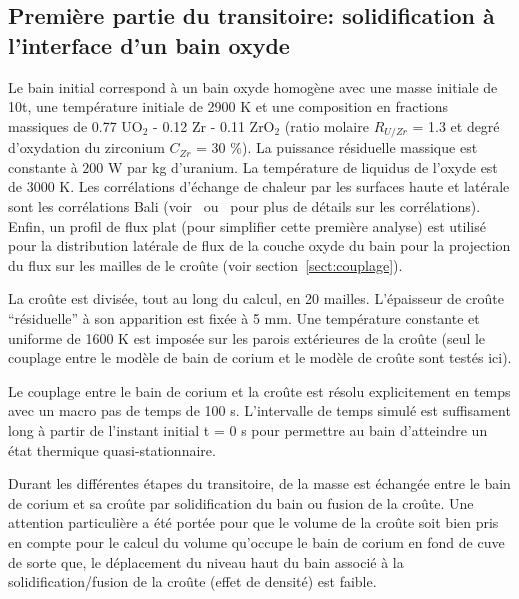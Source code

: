 \subsection{Première partie du transitoire: solidification à l'interface d'un bain oxyde} \label{sect:num1}
Le bain initial correspond à un bain oxyde homogène avec une masse initiale de 10t, une température initiale de 2900 K et une composition en fractions massiques de 0.77 UO$_2$ - 0.12 Zr - 0.11 ZrO$_2$ (ratio molaire $R_{U/Zr}$ = 1.3 et degré  d'oxydation du zirconium $C_{Zr}$ = 30 \%). La puissance résiduelle massique est constante à $200$ W par kg d'uranium. La température de liquidus de l'oxyde est de 3000 K. Les corrélations d'échange de chaleur par les surfaces haute et latérale sont les corrélations Bali (voir~\cite{Bonnet1999} ou~\cite{Tourniaire2009a} pour plus de détails sur les corrélations). Enfin, un profil de flux plat (pour simplifier cette première analyse) est utilisé pour la distribution latérale de flux de la couche oxyde du bain pour la projection du flux sur les mailles de le croûte (voir section~\ref{sect:couplage}).

La croûte est divisée, tout au long du calcul, en 20 mailles. L'épaisseur de croûte ``résiduelle'' à son apparition est fixée à 5 mm. Une température constante et uniforme de 1600 K est imposée sur les parois extérieures de la croûte (seul le couplage entre le modèle de bain de corium et le modèle de croûte sont testés ici).

Le couplage entre le bain de corium et la croûte est résolu explicitement en temps avec un macro pas de temps de 100 s. L'intervalle de temps simulé est suffisament long à partir de l'instant initial t = 0 s pour permettre au bain d'atteindre un état thermique quasi-stationnaire.

Durant les différentes étapes du transitoire, de la masse est échangée entre le bain de corium et sa croûte par solidification du bain ou fusion de la croûte. Une attention particulière a été portée pour que le volume de la croûte soit bien pris en compte pour le calcul du volume qu'occupe le bain de corium en fond de cuve de sorte que, le déplacement du niveau haut du bain associé à la solidification/fusion de la croûte (effet de densité) est faible.

